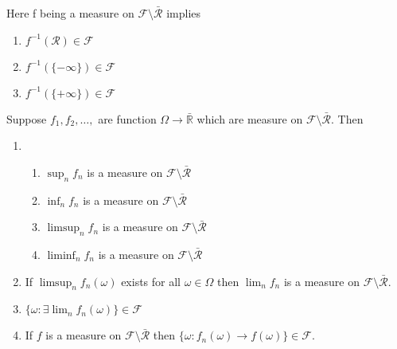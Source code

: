 \documentclass[11pt,fleqn]{book} %
\begin{document}
Here f being a measure on $\mathcal{F}\setminus \bar{\mathcal{R}}$ implies

		\begin{enumerate}
			\item $f^{-1}(\mathcal{R}) \in \mathcal{F}$
			\item $f^{-1}(\{-\infty\}) \in \mathcal{F}$
			\item $f^{-1}(\{+\infty\}) \in \mathcal{F}$
		\end{enumerate}

\begin{theorem}
	Suppose $f_1, f_2, \dots, $ are function $\Omega \rightarrow \bar{\mathbb{R}}$ which are measure on $\mathcal{F} \setminus \bar{\mathcal{R}}$. Then

			\begin{enumerate}
				\item 
					\begin{enumerate}
						\item $\sup_n f_n$ is a measure on $\mathcal{F}\setminus \bar{\mathcal{R}}$
						\item $\inf_n f_n$ is a measure on $\mathcal{F}\setminus \bar{\mathcal{R}}$
						\item $\limsup_n f_n$ is a measure on $\mathcal{F}\setminus \bar{\mathcal{R}}$
						\item $\liminf_n f_n$ is a measure on $\mathcal{F}\setminus \bar{\mathcal{R}}$
					\end{enumerate}

				\item If $\limsup_n f_n(\omega)$ exists for all $\omega\in \Omega$ then $\lim_n f_n$ is a measure on $\mathcal{F}\setminus \bar{\mathcal{R}}$.

				\item $\{\omega: \exists \lim_n f_n(\omega)\} \in \mathcal{F} $

				\item If  $f$ is a measure on $\mathcal{F}\setminus \bar{\mathcal{R}}$ then $\{\omega: f_n(\omega) \rightarrow f(\omega)\} \in \mathcal{F}$.
			\end{enumerate}
\end{theorem}
\end{document}
